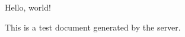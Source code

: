 \documentclass{article}
\begin{document}
Hello, world!

This is a test document generated by the server.
\end{document}
